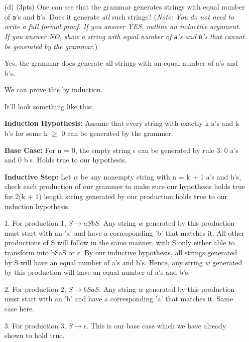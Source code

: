 \documentclass[11pt]{amsart}
\begin{document}
\begin{enumerate}
\item[(d)](3pts) One can see that the grammar generates strings with equal number of \texttt{a}'s and \texttt{b}'s. Does it generate \emph{all} such strings? ({\it{Note: You do not need to write a full formal proof. If you answer YES, outline an inductive argument. If you answer NO, show a string with equal number of \texttt{a}'s and \texttt{b}'s that cannot be generated by the grammar.}})

\vspace{0.25cm}

Yes, the grammar does generate all strings with an equal number of a's and b's.

\vspace{0.25cm}

We can prove this by induction.

\vspace{0.25cm}

It'll look something like this:

\vspace{0.25cm}

\textbf{Induction Hypothesis:} Assume that every string with exactly k a's and k b's for some k $\ge$ 0 can be generated by the grammer.

\textbf{Base Case:} For n = 0, the empty string $\epsilon$ can be generated by rule 3. 0 a's and 0 b's. Holds true to our hypothesis.

\textbf{Inductive Step:} Let $w$ be any nonempty string with n = k + 1 a's and b's, check each production of our grammer to make sure our hypothesis holds true for 2(k + 1) length string generated by our production holds true to our induction hypothesis.

\vspace{0.25cm}

1. For production 1, $S \rightarrow aSbS$. Any string $w$ generated by this production must start with an 'a' and have a corresponding 'b' that matches it. All other productions of S will follow in the same manner, with S only either able to transform into bSaS or $\epsilon$. By our inductive hypothesis, all strings generated by S will have an equal number of a's and b's. Hence, any string $w$ generated by this production will have an equal number of a's and b's.

2. For production 2, $S \rightarrow bSaS$. Any string $w$ generated by this production must start with an 'b' and have a corresponding 'a' that matches it. Same case here.

3. For production 3, $S \rightarrow \epsilon$. This is our base case which we have already shown to hold true.


\end{enumerate}
\end{document}
